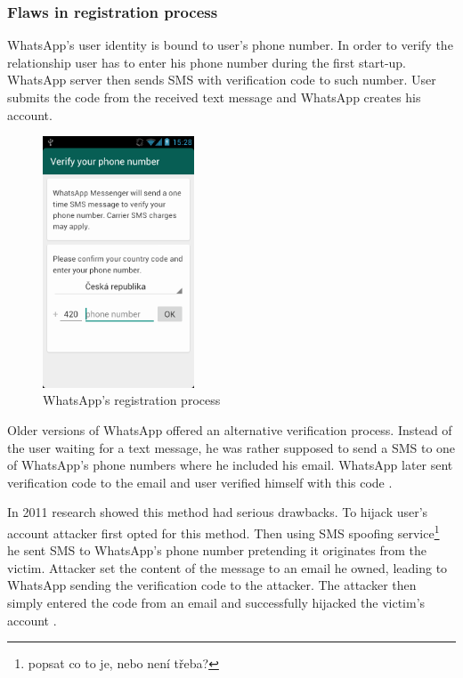 \documentclass[thesis=M,english]{FITthesis}[2012/10/20]
\begin{document}
\subsubsection{Flaws in registration process}

WhatsApp's user identity is bound to user's phone number. In order to verify the relationship user has to enter his phone number during the first start-up. WhatsApp server then sends SMS with verification code to such number. User submits the code from the received text message and WhatsApp creates his account.  

\begin{figure}[htb]
	\centering
	\includegraphics[width=0.4\textwidth]{whatsapp-registration.png}
	\caption{WhatsApp's registration process}
	\label{img:whatsapp_reg}
\end{figure}

Older versions of WhatsApp offered an alternative verification process. Instead of the user waiting for a text message, he was rather supposed to send a SMS to one of WhatsApp's phone numbers where he included his email. WhatsApp later sent verification code to the email and user verified himself with this code \cite{whatsapp-shootingthemsg}.

In 2011 research showed this method had serious drawbacks. To hijack user's account attacker first opted for this method. Then using SMS spoofing service\footnote{popsat co to je, nebo není třeba?} he sent SMS to WhatsApp's phone number pretending it originates from the victim. Attacker set the content of the message to an email he owned, leading to WhatsApp sending the verification code to the attacker. The attacker then simply entered the code from an email and successfully hijacked the victim's account \cite{whatsapp-hijack1}.
\end{document}
